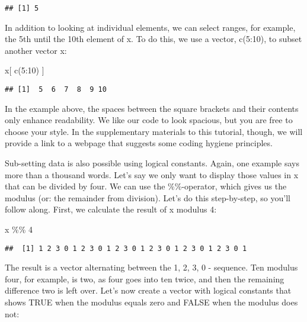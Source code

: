 \documentclass[
]{article}
\newenvironment{Shaded}{\begin{snugshade}}{\end{snugshade}}
\newcommand{\DecValTok}[1]{\textcolor[rgb]{0.00,0.00,0.81}{#1}}
\newcommand{\FunctionTok}[1]{\textcolor[rgb]{0.00,0.00,0.00}{#1}}
\newcommand{\NormalTok}[1]{#1}
\newcommand{\SpecialCharTok}[1]{\textcolor[rgb]{0.00,0.00,0.00}{#1}}
\begin{document}
\begin{verbatim}
## [1] 5
\end{verbatim}

In addition to looking at individual elements, we can select ranges, for
example, the 5th until the 10th element of x. To do this, we use a
vector, c(5:10), to subset another vector x:

\begin{Shaded}
\begin{Highlighting}[]
\NormalTok{x[ }\FunctionTok{c}\NormalTok{(}\DecValTok{5}\SpecialCharTok{:}\DecValTok{10}\NormalTok{) ]}
\end{Highlighting}
\end{Shaded}

\begin{verbatim}
## [1]  5  6  7  8  9 10
\end{verbatim}

In the example above, the spaces between the square brackets and their
contents only enhance readability. We like our code to look spacious,
but you are free to choose your style. In the supplementary materials to
this tutorial, though, we will provide a link to a webpage that suggests
some coding hygiene principles.

Sub-setting data is also possible using logical constants. Again, one
example says more than a thousand words. Let's say we only want to
display those values in x that can be divided by four. We can use the
\%\%-operator, which gives us the modulus (or: the remainder from
division). Let's do this step-by-step, so you'll follow along. First, we
calculate the result of x modulus 4:

\begin{Shaded}
\begin{Highlighting}[]
\NormalTok{x }\SpecialCharTok{\%\%} \DecValTok{4}
\end{Highlighting}
\end{Shaded}

\begin{verbatim}
##  [1] 1 2 3 0 1 2 3 0 1 2 3 0 1 2 3 0 1 2 3 0 1 2 3 0 1
\end{verbatim}

The result is a vector alternating between the 1, 2, 3, 0 - sequence.
Ten modulus four, for example, is two, as four goes into ten twice, and
then the remaining difference two is left over. Let's now create a
vector with logical constants that shows TRUE when the modulus equals
zero and FALSE when the modulus does not:
\end{document}
